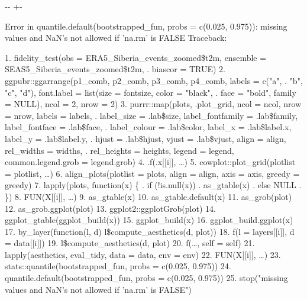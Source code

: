 \documentclass[letterpaper,10pt,english]{sphinxmanual}
\newlength\nbsphinxcodecellspacing
\begin{document}
{

\kern-\sphinxverbatimsmallskipamount\kern-\baselineskip
\kern+\FrameHeightAdjust\kern-\fboxrule
\vspace{\nbsphinxcodecellspacing}

\begin{sphinxVerbatim}[commandchars=\\\{\}]
Error in quantile.default(bootstrapped\_fun, probs = c(0.025, 0.975)): missing values and NaN's not allowed if 'na.rm' is FALSE
Traceback:

1. fidelity\_test(obs = ERA5\_Siberia\_events\_zoomed\$t2m, ensemble = SEAS5\_Siberia\_events\_zoomed\$t2m,
 .     biascor = TRUE)
2. ggpubr::ggarrange(p1\_comb, p2\_comb, p3\_comb, p4\_comb, labels = c("a",
 .     "b", "c", "d"), font.label = list(size = fontsize, color = "black",
 .     face = "bold", family = NULL), ncol = 2, nrow = 2)
3. purrr::map(plots, .plot\_grid, ncol = ncol, nrow = nrow, labels = labels,
 .     label\_size = .lab\$size, label\_fontfamily = .lab\$family, label\_fontface = .lab\$face,
 .     label\_colour = .lab\$color, label\_x = .lab\$label.x, label\_y = .lab\$label.y,
 .     hjust = .lab\$hjust, vjust = .lab\$vjust, align = align, rel\_widths = widths,
 .     rel\_heights = heights, legend = legend, common.legend.grob = legend.grob)
4. .f(.x[[i]], {\ldots})
5. cowplot::plot\_grid(plotlist = plotlist, {\ldots})
6. align\_plots(plotlist = plots, align = align, axis = axis, greedy = greedy)
7. lapply(plots, function(x) \{
 .     if (!is.null(x))
 .         as\_gtable(x)
 .     else NULL
 . \})
8. FUN(X[[i]], {\ldots})
9. as\_gtable(x)
10. as\_gtable.default(x)
11. as\_grob(plot)
12. as\_grob.ggplot(plot)
13. ggplot2::ggplotGrob(plot)
14. ggplot\_gtable(ggplot\_build(x))
15. ggplot\_build(x)
16. ggplot\_build.ggplot(x)
17. by\_layer(function(l, d) l\$compute\_aesthetics(d, plot))
18. f(l = layers[[i]], d = data[[i]])
19. l\$compute\_aesthetics(d, plot)
20. f({\ldots}, self = self)
21. lapply(aesthetics, eval\_tidy, data = data, env = env)
22. FUN(X[[i]], {\ldots})
23. stats::quantile(bootstrapped\_fun, probs = c(0.025, 0.975))
24. quantile.default(bootstrapped\_fun, probs = c(0.025, 0.975))
25. stop("missing values and NaN's not allowed if 'na.rm' is FALSE")
\end{sphinxVerbatim}
}

{
\begin{sphinxVerbatim}[commandchars=\\\{\}]
\llap{\color{nbsphinxin}[9]:\,\hspace{\fboxrule}\hspace{\fboxsep}}     
\end{sphinxVerbatim}
}
\end{document}
